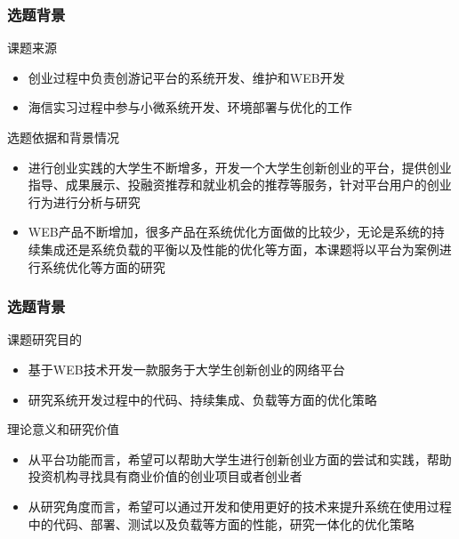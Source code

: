 \documentclass{beamer}
\begin{document}
\begin{frame}
  \frametitle{选题背景}
  \begin{block}{课题来源}
  	\begin{itemize}
  		\item 创业过程中负责创游记平台的系统开发、维护和WEB开发
  		\item 海信实习过程中参与小微系统开发、环境部署与优化的工作
  	\end{itemize}
  \end{block}
  \pause %
  \begin{block}{选题依据和背景情况}
  	\begin{itemize}
  		\item \cite{chuangye1}进行创业实践的大学生不断增多，开发一个大学生创新创业的平台，提供创业指导、成果展示、投融资推荐和就业机会的推荐等服务，针对平台用户的创业行为进行分析与研究
      \item WEB产品不断增加，很多产品在系统优化方面做的比较少，无论是系统的持续集成还是系统负载的平衡以及性能的优化等方面，本课题将以平台为案例进行系统优化等方面的研究
  	\end{itemize}
  \end{block}
\end{frame}

\begin{frame}
  \frametitle{选题背景}
  \begin{block}{课题研究目的}
  	\begin{itemize}
  		\item 基于WEB技术开发一款服务于大学生创新创业的网络平台
  		\item 研究系统开发过程中的代码、持续集成、负载等方面的优化策略
  	\end{itemize}
  \end{block}
  \pause
  \begin{block}{理论意义和研究价值}
  	\begin{itemize}
  		\item 从平台功能而言，希望可以帮助大学生进行创新创业方面的尝试和实践，帮助投资机构寻找具有商业价值的创业项目或者创业者
  		\item 从研究角度而言，希望可以通过开发和使用更好的技术来提升系统在使用过程中的代码、部署、测试以及负载等方面的性能，研究一体化的优化策略
  	\end{itemize}
  \end{block}
\end{frame}
\end{document}
